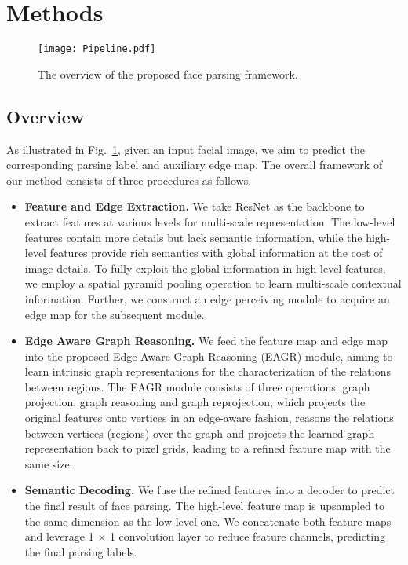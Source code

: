 \documentclass[runningheads]{llncs}
\begin{document}
\section{Methods}


\begin{figure}[t]
    \centering
    \texttt{[image: Pipeline.pdf]}
    \caption{The overview of the proposed face parsing framework.}
    \label{fig:framework}
\end{figure}

\subsection{Overview}\label{sec3.1}

As illustrated in Fig.~\ref{fig:framework}, given an input facial image, we aim to predict the corresponding parsing label and auxiliary edge map. The overall framework of our method consists of three procedures as follows. 

\begin{itemize}
    \item \textbf{Feature and Edge Extraction.} We take ResNet as the backbone to extract features at various levels for multi-scale representation.  
    The low-level features contain more details but lack semantic information, while the high-level features provide rich semantics with global information at the cost of image details. To fully exploit the global information in high-level features, we employ a spatial pyramid pooling operation to learn multi-scale contextual information.
    Further, we construct an edge perceiving module to acquire an edge map for the subsequent module. 
    
    \item \textbf{Edge Aware Graph Reasoning.} We feed the feature map and edge map into the proposed Edge Aware Graph Reasoning (EAGR) module, aiming to learn intrinsic graph representations for the characterization of the relations between regions. 
    The EAGR module consists of three operations: graph projection, graph reasoning and graph reprojection, which projects the original features onto vertices in an edge-aware fashion, reasons the relations between vertices (regions) over the graph and projects the learned graph representation back to pixel grids, leading to a refined feature map with the same size.
    
    \item \textbf{Semantic Decoding.} We fuse the refined features into a decoder to predict the final result of face parsing. The high-level feature map is upsampled to the same dimension as the low-level one. 
    We concatenate both feature maps and leverage 1 $\times$ 1 convolution layer to reduce feature channels, predicting the final parsing labels.
\end{itemize}
\end{document}
